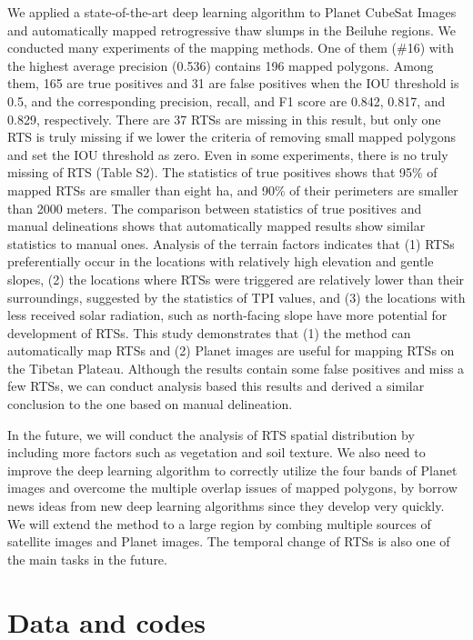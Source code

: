 \documentclass[preprint,12pt,authoryear]{elsarticle}
\begin{document}
We applied a state-of-the-art deep learning algorithm to Planet CubeSat Images and automatically mapped retrogressive thaw slumps in the Beiluhe regions. We conducted many experiments of the mapping methods. One of them (\#16) with the highest average precision (0.536) contains 196 mapped polygons. Among them, 165 are true positives and 31 are false positives when the IOU threshold is 0.5, and the corresponding precision, recall, and F1 score are 0.842, 0.817, and 0.829, respectively. There are 37 RTSs are missing in this result, but only one RTS is truly missing if we lower the criteria of removing small mapped polygons and set the IOU threshold as zero. Even in some experiments, there is no truly missing of RTS (Table S2). The statistics of true positives shows that 95\% of mapped RTSs are smaller than eight ha, and 90\% of their perimeters are smaller than 2000 meters. The comparison between statistics of true positives and manual delineations shows that automatically mapped results show similar statistics to manual ones. Analysis of the terrain factors indicates that (1) RTSs preferentially occur in the locations with relatively high elevation and gentle slopes, (2) the locations where RTSs were triggered are relatively lower than their surroundings, suggested by the statistics of TPI values, and (3) the locations with less received solar radiation, such as north-facing slope have more potential for development of RTSs. This study demonstrates that (1) the method can automatically map RTSs and (2) Planet images are useful for mapping RTSs on the Tibetan Plateau. Although the results contain some false positives and miss a few RTSs, we can conduct analysis based this results and derived a similar conclusion to the one based on manual delineation. 

In the future, we will conduct the analysis of RTS spatial distribution by including more factors such as vegetation and soil texture. We also need to improve the deep learning algorithm to correctly utilize the four bands of Planet images and overcome the multiple overlap issues of mapped polygons, by borrow news ideas from new deep learning algorithms since they develop very quickly. We will extend the method to a large region by combing multiple sources of satellite images and Planet images. The temporal change of RTSs is also one of the main tasks in the future. 

\section{Data and codes}
\label{sec_data_codes}
\end{document}
